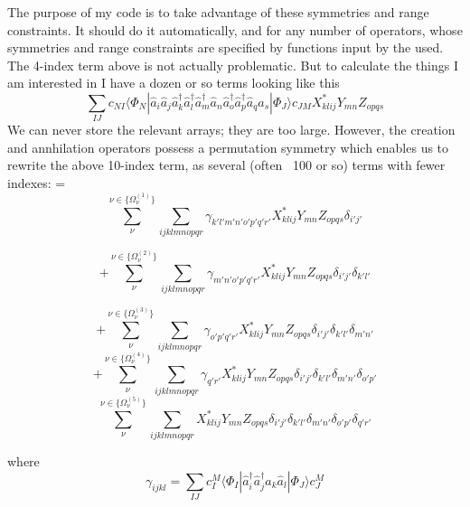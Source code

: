\documentclass[12pt]{article}
\begin{document}
The purpose of my code is to take advantage of these symmetries and range constraints. It should do it automatically,
and for any number of operators, whose symmetries and range constraints are specified by functions input by the used. The 4-index term above
is not actually problematic. But to calculate the things I am interested in I have a dozen or so terms looking like this
\begin{equation}
\sum_{IJ} c_{NI}\langle \Phi_{N} |
\hat{a}_{i}
\hat{a}_{j}
\hat{a}_{k}^{\dagger}
\hat{a}_{l}^{\dagger}
\hat{a}_{m}^{\dagger}
\hat{a}_{n}
\hat{a}_{o}^{\dagger}
\hat{a}_{p}^{\dagger}
\hat{a}_{q}
\hat{a}_{s}
 | \Phi_{J} \rangle c_{JM}  
X^{*}_{klij}Y_{mn}Z_{opqs}
\label{eqn:original}
\end{equation}
We can never store the relevant arrays; they are too large. However, the creation and annhilation operators possess a
permutation symmetry which enables us to rewrite
the above 10-index term, as several (often ~100 or so) terms with fewer indexes:
=
\begin{equation}
\sum_{\nu}^{ \nu \in \{\Omega^{(1)}_{\nu}\}}
\sum_{ijklmnopqr}
\gamma_{k'l'm'n'o'p'q'r'}
X^{*}_{klij}Y_{mn}Z_{opqs}
\delta_{i'j'}
\end{equation}

\begin{equation}+
\sum_{\nu}^{ \nu \in \{\Omega^{(2)}_{\nu}\}}
\sum_{ijklmnopqr}
\gamma_{m'n'o'p'q'r'}
X^{*}_{klij}Y_{mn}Z_{opqs}
\delta_{i'j'}\delta_{k'l'}
\end{equation}

\begin{equation}+
\sum_{\nu}^{ \nu \in \{\Omega^{(3)}_{\nu}\}}
\sum_{ijklmnopqr}
\gamma_{o'p'q'r'}
X^{*}_{klij}Y_{mn}Z_{opqs}
\delta_{i'j'}\delta_{k'l'}\delta_{m'n'}
\end{equation}
\begin{equation}+
\sum_{\nu}^{ \nu \in \{\Omega^{(4)}_{\nu}\}}
\sum_{ijklmnopqr}
\gamma_{q'r'}
X^{*}_{klij}Y_{mn}Z_{opqs}
\delta_{i'j'}\delta_{k'l'}\delta_{m'n'}\delta_{o'p'}
\end{equation}
\begin{equation}
\sum_{\nu}^{ \nu \in \{\Omega^{(5)}_{\nu}\}}
\sum_{ijklmnopqr}
X^{*}_{klij}Y_{mn}Z_{opqs}
\delta_{i'j'}\delta_{k'l'}\delta_{m'n'}\delta_{o'p'}\delta_{q'r'}
\label{eqn:wicked}
\end{equation}

where 
\begin{equation}
\gamma_{ijkl} =\sum_{IJ} c^{M}_{I}\langle \Phi_{I} | \hat{a}_{i}^{\dagger}\hat{a}_{j}^{\dagger}\hat{a}_{k}\hat{a}_{l} | \Phi_{J} \rangle c_{J}^{M}  
\end{equation}
\end{document}

